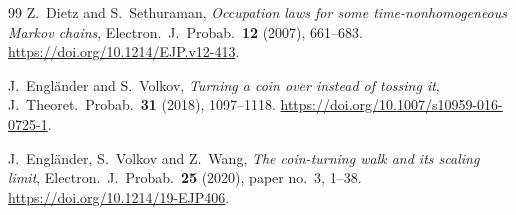 \documentclass[11pt]{article}
\theoremstyle{definition}
\theoremstyle{remark}
\begin{document}
\begin{thebibliography}{99}
Z.~Dietz and S.~Sethuraman, \emph{Occupation laws for some
time-nonhomogeneous Markov chains}, Electron.\ J.\ Probab.\ \textbf{12}
(2007), 661--683. \url{https://doi.org/10.1214/EJP.v12-413}.

J.~Engl\"ander and S.~Volkov, \emph{Turning a coin over instead of tossing
it}, J.\ Theoret.\ Probab.\ \textbf{31} (2018), 1097--1118.
\url{https://doi.org/10.1007/s10959-016-0725-1}.

J.~Engl\"ander, S.~Volkov and Z.~Wang, \emph{The coin-turning walk and its
scaling limit}, Electron.\ J.\ Probab.\ \textbf{25} (2020), paper no.~3,
1--38. \url{https://doi.org/10.1214/19-EJP406}.

\end{thebibliography}
\end{document}
